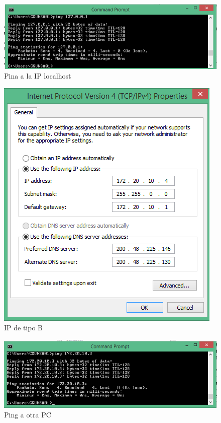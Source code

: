 \documentclass[a4paper,12pt]{article}
\begin{document}
 \begin{figure}[H]
  \centering
  \includegraphics[scale = 0.5]{12.png}
  \caption{Pina a la IP localhost}
 \end{figure}
 
 \begin{figure}[H]
  \centering
  \includegraphics[scale = 0.5]{13.png}
  \caption{IP de tipo B}
 \end{figure}
 
 \begin{figure}[H]
  \centering
  \includegraphics[scale = 0.5]{14.png}
  \caption{Ping a otra PC}
 \end{figure}
 
\end{document}
